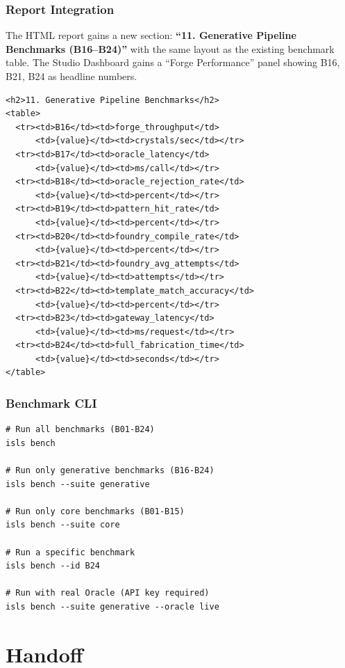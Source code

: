 \documentclass[11pt,a4paper,twoside]{article}
\theoremstyle{definition}
\theoremstyle{plain}
\theoremstyle{remark}
\begin{document}
\section{Report Integration}\label{sec:report}

The HTML report gains a new section: \textbf{``11. Generative Pipeline
Benchmarks (B16--B24)''} with the same layout as the existing
benchmark table. The Studio Dashboard gains a ``Forge Performance''
panel showing B16, B21, B24 as headline numbers.

\begin{lstlisting}[title={Report Section 11}]
<h2>11. Generative Pipeline Benchmarks</h2>
<table>
  <tr><td>B16</td><td>forge_throughput</td>
      <td>{value}</td><td>crystals/sec</td></tr>
  <tr><td>B17</td><td>oracle_latency</td>
      <td>{value}</td><td>ms/call</td></tr>
  <tr><td>B18</td><td>oracle_rejection_rate</td>
      <td>{value}</td><td>percent</td></tr>
  <tr><td>B19</td><td>pattern_hit_rate</td>
      <td>{value}</td><td>percent</td></tr>
  <tr><td>B20</td><td>foundry_compile_rate</td>
      <td>{value}</td><td>percent</td></tr>
  <tr><td>B21</td><td>foundry_avg_attempts</td>
      <td>{value}</td><td>attempts</td></tr>
  <tr><td>B22</td><td>template_match_accuracy</td>
      <td>{value}</td><td>percent</td></tr>
  <tr><td>B23</td><td>gateway_latency</td>
      <td>{value}</td><td>ms/request</td></tr>
  <tr><td>B24</td><td>full_fabrication_time</td>
      <td>{value}</td><td>seconds</td></tr>
</table>
\end{lstlisting}


\section{Benchmark CLI}\label{sec:benchcli}

\begin{lstlisting}
# Run all benchmarks (B01-B24)
isls bench

# Run only generative benchmarks (B16-B24)
isls bench --suite generative

# Run only core benchmarks (B01-B15)
isls bench --suite core

# Run a specific benchmark
isls bench --id B24

# Run with real Oracle (API key required)
isls bench --suite generative --oracle live
\end{lstlisting}


\part{Handoff}\label{part:handoff}
\end{document}
